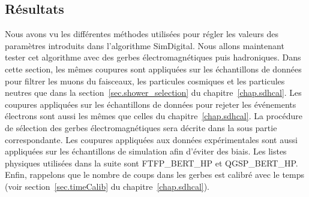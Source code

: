\subsection{Résultats}
\label{sec.resultats}
Nous avons vu les différentes méthodes utilisées pour régler les valeurs des paramètres introduits dans l'algorithme SimDigital. Nous allons maintenant tester cet algorithme avec des gerbes électromagnétiques puis hadroniques. Dans cette section, les mêmes coupures sont appliquées sur les échantillons de données pour filtrer les muons du faisceaux, les particules cosmiques et les particules neutres que dans la section~\ref{sec.shower_selection} du chapitre~\ref{chap.sdhcal}. Les coupures appliquées sur les échantillons de données pour rejeter les événements électrons sont aussi les mêmes que celles du chapitre~\ref{chap.sdhcal}. La procédure de sélection des gerbes électromagnétiques sera décrite dans la sous partie correspondante. Les coupures appliquées aux données expérimentales sont aussi appliquées sur les échantillons de simulation afin d'éviter des biais. Les listes physiques utilisées dans la suite sont FTFP\_BERT\_HP et QGSP\_BERT\_HP. Enfin, rappelons que le nombre de coups dans les gerbes est calibré avec le temps (voir section~\ref{sec.timeCalib} du chapitre~\ref{chap.sdhcal}).


